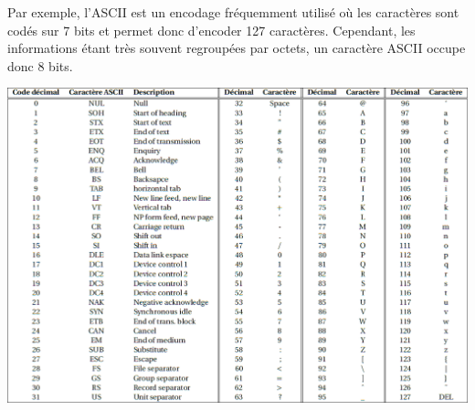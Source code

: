 \documentclass[10pt,fleqn]{article} %
\begin{document}
Par exemple, l'ASCII est un encodage fréquemment utilisé où les caractères sont codés sur 7 bits et permet donc d'encoder 127 caractères. Cependant, les informations étant très souvent regroupées par octets, un caractère ASCII occupe donc 8 bits. 
\begin{center}
\includegraphics[width=\linewidth]{images/ascii}
\end{center}
\end{document}
